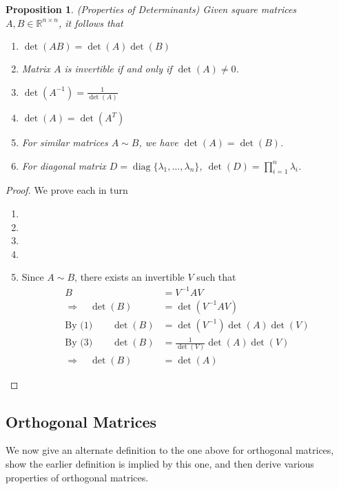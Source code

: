 \documentclass[12pt]{article}
\numberwithin{equation}{section} %
\theoremstyle{plain}
\newtheorem{prop}[thm]{Proposition}
\theoremstyle{definition}
\theoremstyle{remark}
\newcommand{\diag}{\operatorname{diag}}
\newcommand{\R}{\mathbb{R}}
\begin{document}
\begin{prop}{\emph{(Properties of Determinants)}}
Given square matrices $A,B\in \R^{n\times n}$, it follows that
\begin{enumerate}
  \item $\det(AB) = \det(A) \det(B)$
  \item Matrix $A$ is invertible if and only if $\det(A) \neq 0$.
  \item $\det(A^{-1}) = \frac{1}{\det(A)}$
  \item $\det(A) = \det(A^T)$
  \item For similar matrices $A\sim B$, we have $\det(A) = \det(B)$.
  \item For diagonal matrix $D=\diag\{\lambda_1,\ldots,\lambda_n\}$,
    $\det(D) = \prod^n_{i=1} \lambda_i$.
\end{enumerate}
\end{prop}
\begin{proof}
We prove each in turn
\begin{enumerate}
  \item
  \item
  \item
  \item
  \item Since $A\sim B$, there exists an invertible $V$ such that
    \begin{align*}
      B &= V^{-1} A V\\
      \Rightarrow\quad
      \det(B) &= \det(V^{-1} A V)\\
      \text{By (1)} \quad\quad
      \det(B) &= \det(V^{-1}) \det(A) \det(V)\\
      \text{By (3)} \quad\quad
      \det(B) &= \frac{1}{\det(V)} \det(A) \det(V)\\
      \Rightarrow\quad
      \det(B) &= \det(A)
    \end{align*}
\end{enumerate}
\end{proof}

\clearpage
\subsection{Orthogonal Matrices}

We now give an alternate definition to the one above for orthogonal
matrices, show the earlier definition is implied by this one, and then
derive various properties of orthogonal matrices.
\end{document}
